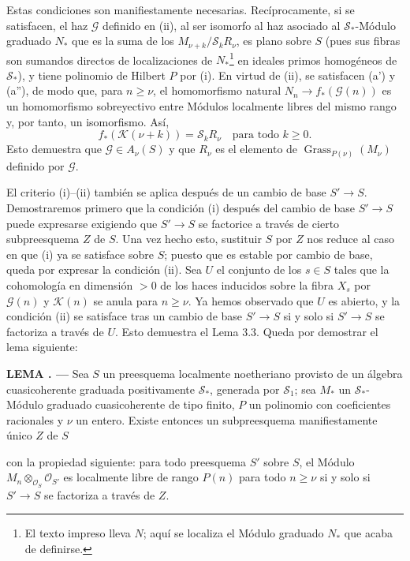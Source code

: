 \documentclass[11pt,twoside,openany]{book}
\numberwithin{equation}{section}
\newcommand{\src}[1]{%
  \phantomsection\hypertarget{src:#1}{}%
  \marginpar{\raggedleft\footnotesize\sffamily #1}%
}
\theoremstyle{plain}
\theoremstyle{definition}
\theoremstyle{remark}
\newcommand{\result}[2]{%
  \par\medskip\noindent\textbf{#1%
  \if\relax\detokenize{#2}\relax\else\space#2\fi. ---}\enspace
}
\newcommand{\FgaUnitKey}{frontmatter}
\renewcommand{\src}[1]{%
  \phantomsection\hypertarget{src:\FgaUnitKey:#1}{}%
  \marginpar{\raggedleft\footnotesize\sffamily #1}%
}
\theoremstyle{plain}
\theoremstyle{definition}
\theoremstyle{remark}
\begin{document}
Estas condiciones son manifiestamente necesarias. Recíprocamente, si se
satisfacen, el haz $\mathcal G$ definido en (ii), al ser isomorfo al haz
asociado al $\mathcal S_*$-Módulo graduado $N_*$ que es la suma de los
$M_{\nu+k}/\mathcal S_kR_\nu$, es plano sobre $S$ (pues sus fibras son
sumandos directos de localizaciones de $N_*$\footnote{El texto impreso lleva $N$; aquí se localiza el Módulo graduado $N_*$ que acaba de definirse.} en ideales primos homogéneos de
$\mathcal S_*$), y tiene polinomio de Hilbert $P$ por (i). En virtud de (ii),
se satisfacen (a') y (a''), de modo que, para $n\geq\nu$, el homomorfismo
natural $N_n\longrightarrow f_*(\mathcal G(n))$ es un homomorfismo
sobreyectivo entre Módulos localmente libres del mismo rango y, por tanto, un
isomorfismo. Así,
\[
f_*(\mathcal K(\nu+k))=\mathcal S_kR_\nu
\quad\text{para todo $k\geq0$}.
\]
Esto demuestra que $\mathcal G\in A_\nu(S)$ y que $R_\nu$ es el elemento de
$\operatorname{Grass}_{P(\nu)}(M_\nu)$ definido por $\mathcal G$.

El criterio (i)--(ii) también se aplica después de un cambio de base
$S'\longrightarrow S$. Demostraremos primero que la condición (i) después del
cambio de base $S'\longrightarrow S$ puede expresarse exigiendo que
$S'\longrightarrow S$ se factorice a través de cierto subpreesquema $Z$ de
$S$. Una vez hecho esto, sustituir $S$ por $Z$ nos reduce al caso en que (i) ya
se satisface sobre $S$; puesto que es estable por cambio de base, queda por
expresar la condición (ii). Sea $U$ el conjunto de los $s\in S$ tales que la
cohomología en dimensión $>0$ de los haces inducidos sobre la fibra $X_s$ por
$\mathcal G(n)$ y $\mathcal K(n)$ se anula para $n\geq\nu$. Ya hemos observado
que $U$ es abierto, y la condición (ii) se satisface tras un cambio de base
$S'\longrightarrow S$ si y solo si $S'\longrightarrow S$ se factoriza a
través de $U$. Esto demuestra el Lema 3.3. Queda por demostrar el lema
siguiente:

\result{LEMA}{3.4} Sea $S$ un preesquema localmente noetheriano provisto de un
álgebra cuasicoherente graduada positivamente $\mathcal S_*$, generada por
$\mathcal S_1$; sea $M_*$ un $\mathcal S_*$-Módulo graduado cuasicoherente de
tipo finito, $P$ un polinomio con coeficientes racionales y $\nu$ un entero.
Existe entonces un subpreesquema manifiestamente único $Z$ de $S$
\src{263}
con la propiedad siguiente: para todo preesquema $S'$ sobre $S$, el Módulo
$M_n\otimes_{\mathcal O_S}\mathcal O_{S'}$ es localmente libre de rango $P(n)$
para todo $n\geq\nu$ si y solo si $S'\longrightarrow S$ se factoriza a través
de $Z$.
\end{document}
